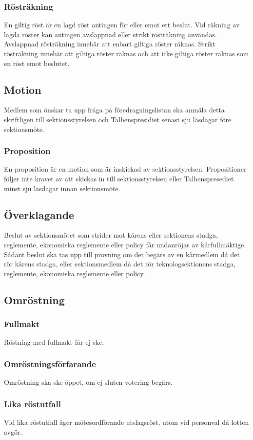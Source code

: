 \documentclass[a4paper]{dtek}
\begin{document}
\subsubsection{Rösträkning}
En giltig röst är en lagd röst antingen för eller emot ett beslut.
Vid räkning av lagda röster kan antingen avslappnad eller strikt rösträkning användas.
Avslappnad rösträkning innebär att enbart giltiga röster räknas.
Strikt rösträkning innebär att giltiga röster räknas och att icke giltiga röster räknas som en röst emot beslutet.
\subsection{Motion}
Medlem som önskar ta upp fråga på föredragningslistan ska anmäla detta skriftligen till sektionsstyrelsen och Talhenspresidiet senast sju läsdagar före sektionsmöte.
\subsubsection{Proposition}
En proposition är en motion som är inskickad av sektionsstyrelsen.
Propositioner följer inte kravet av att skickas in till sektionsstyrelsen eller Talhenspresediet minst sju läsdagar innan sektionsmöte.
\subsection{Överklagande}
Beslut av sektionsmötet som strider mot kårens eller sektionens stadga, reglemente, ekonomiska reglemente eller policy får undanröjas av kårfullmäktige. Sådant beslut ska tas upp till prövning om det begärs av en kårmedlem då det rör kårens stadga, eller sektionsmedlem då det rör teknologsektionens stadga, reglemente, ekonomiska reglemente eller policy.
\subsection{Omröstning}
\subsubsection{Fullmakt}
Röstning med fullmakt får ej ske.
\subsubsection{Omröstningsförfarande}
Omröstning ska ske öppet, om ej sluten votering begärs.
\subsubsection{Lika röstutfall}
Vid lika röstutfall äger mötesordförande utslagsröst, utom vid personval då lotten avgör.
\end{document}
